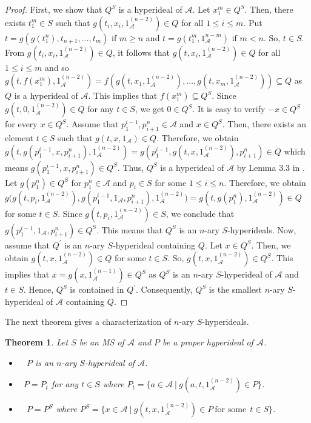 \documentclass[preprint,review,10pt]{amsart}
\newtheorem{theorem}{Theorem}[section]
\theoremstyle{definition}
\theoremstyle{remark}
\numberwithin{equation}{section}
\begin{document}
\begin{proof}
First, we show that $Q^S$ is a hyperideal of $\mathscr{A}$. Let $x_1^m \in Q^S$. Then, there exists $t_1^m \in S$ such that $g(t_i,x_i,1_\mathscr{A}^{(n-2)}) \in Q$ for all $1 \leq i \leq m$. Put $t=g(g(t_1^n),t_{n+1},\ldots, t_m)$ if $ m \geq n$ and $t=g(t_1^m, 1_\mathscr{A}^{n-m})$ if $m < n$. So, $t \in S$. From $g(t_i,x_i,1_\mathscr{A}^{(n-2)}) \in Q$, it follows that $g(t,x_i,1_\mathscr{A}^{(n-2)}) \in Q$  for all $1 \leq i \leq m$ and so $g(t,f(x_1^m),1_\mathscr{A}^{(n-2)})=f(g(t,x_1,1_\mathscr{A}^{(n-2)}),\ldots,g(t,x_m,1_\mathscr{A}^{(n-2)})) \subseteq Q$ as $Q$ is a hyperideal of $\mathscr{A}$. This implies that $f(x_1^m) \subseteq Q^S$.  Since $g(t,0,1_\mathscr{A}^{(n-2)}) \in Q$ for any $t \in S$, we get $0 \in  Q^S$. It is easy to verify $-x \in  Q^S$ for every $x \in  Q^S$. Assume that $p_1^{i-1},p_{i+1}^n \in  \mathscr{A}$ and $x \in Q^S$. Then, there exists an element $t \in S$ such that $g(t,x,1_\mathscr{A}) \in Q$. Therefore,  we obtain $g(t,g(p_1^{i-1},x,p_{i+1}^n),1_\mathscr{A}^{(n-2)})=g(p_1^{i-1},g(t,x,1_\mathscr{A}^{(n-2)}),p_{i+1}^n) \in Q$ which means $g(p_1^{i-1},x,p_{i+1}^n) \in Q^S$. Thus, $Q^S$ is a hyperideal of $\mathscr{A}$ by Lemma 3.3 in \cite{d1}. Let $g(p_1^n) \in Q^S$ for $p_1^n \in \mathscr{A}$ and $p_i \in S$ for some $1 \leq i \leq n$. Therefore, we obtain $g \big(g(t,p_i,1_\mathscr{A}^{(n-2)}),g(p_1^{i-1},1_\mathscr{A},p_{i+1}^n),1_\mathscr{A}^{(n-2)} \big)=g(t,g(p_1^n),1_\mathscr{A}^{(n-2)}) \in Q$ for some $t \in S$. Since $g(t,p_i,1_\mathscr{A}^{(n-2)}) \in S$, we conclude that $g(p_1^{i-1},1_\mathscr{A},p_{i+1}^n) \in Q^S$. This means that $Q^S$ is an $n$-ary $S$-hyperideals. Now, assume that $Q^{\prime}$ is an $n$-ary $S$-hyperideal containing $Q$. Let $x \in Q^S$. Then, we obtain $g(t,x,1_\mathscr{A}^{(n-2)}) \in Q$ for some $t \in S$. So,  $g(t,x,1_\mathscr{A}^{(n-2)}) \in Q^S$. This implies that $x=g(x,1_\mathscr{A}^{(n-1)})\in Q^S$ as $Q^S$ is an $n$-ary $S$-hyperideal of  $\mathscr{A}$  and $t \in S$. Hence, $Q^S$ is contained in  $Q^{\prime}$. Consequently, $Q^S$ is the smallest $n$-ary $S$-hyperideal of $\mathscr{A}$ containing $Q$.
\end{proof}
The next theorem gives a characterization of $n$-ary $S$-hyperideals.
\begin{theorem} \label{5}
Let $S$ be an MS of  $\mathscr{A}$ and  $P$ be a proper hyperideal of  $\mathscr{A}$.  
\begin{itemize}
\item[\rm{{\bf (1) }}]~ $P$ is an $n$-ary $S$-hyperideal of $\mathscr{A}$.
\item[\rm{{\bf (2) }}]~$P=P_t$ for any $t \in S$ where $P_t=\{a \in \mathscr{A} \ \vert \ g(a,t,1_\mathscr{A}^{(n-2)}) \in P\}$.
\item[\rm{{\bf (3) }}]~ $P=P^S$ where $P^S=\{x \in \mathscr{A} \ \vert \ g(t,x,1_\mathscr{A}^{(n-2)}) \in P\ \text{for some}  \ \ t \in S\}$.
\end{itemize}
\end{theorem}
\end{document}
